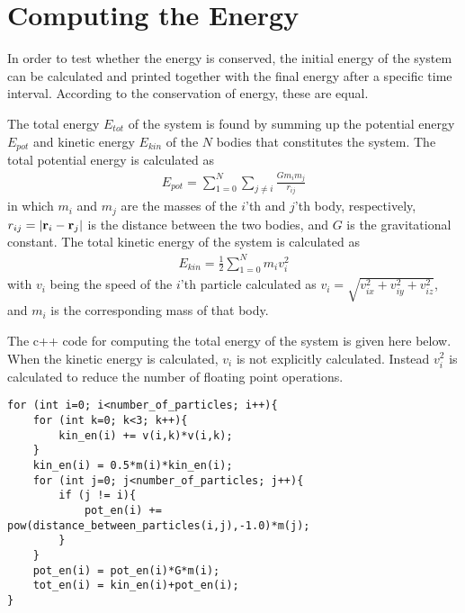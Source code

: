 \section{Computing the Energy}
\label{sec:ComputingEnergy}
In order to test whether the energy is conserved, the initial energy of the system can be calculated and printed together with the final energy after a specific time interval.
According to the conservation of energy, these are equal. 

The total energy $E_{tot}$ of the system is found by summing up the potential energy $E_{pot}$ and kinetic energy $E_{kin}$ of the $N$ bodies that constitutes the system.
The total potential energy is calculated as 
\begin{align}
	E_{pot} = \sum _{1=0} ^N \sum _{j \neq i} \frac{G m_i m_j}{r_{ij}}
\end{align}
in which $m_i$ and $m_j$ are the masses of the $i$'th and $j$'th body, respectively, $r_{ij} = | \mbox{\textbf{r}}_i - \mbox{\textbf{r}}_j |$ is the distance between the two bodies, and $G$ is the gravitational constant. 
The total kinetic energy of the system is calculated as 
\begin{align}
	E_{kin} = \frac{1}{2} \sum _{1=0} ^N m_i v_i ^2
\end{align}
with $v_i$ being the speed of the $i$'th particle calculated as 
$v_i = \sqrt{v_{ix}^2 +v_{iy}^2 +v_{iz}^2}$, and $m_i$ is the corresponding mass of that body. 

The c++ code for computing the total energy of the system is given here below.
When the kinetic energy is calculated, $v_i$ is not explicitly calculated. Instead $v_i^2$ is calculated to reduce the number of floating point operations. 
\begin{lstlisting}
for (int i=0; i<number_of_particles; i++){
	for (int k=0; k<3; k++){
    	kin_en(i) += v(i,k)*v(i,k);
    }
    kin_en(i) = 0.5*m(i)*kin_en(i);
    for (int j=0; j<number_of_particles; j++){
        if (j != i){
        	pot_en(i) += pow(distance_between_particles(i,j),-1.0)*m(j);
        }
    }
    pot_en(i) = pot_en(i)*G*m(i);
    tot_en(i) = kin_en(i)+pot_en(i);
}
\end{lstlisting}

